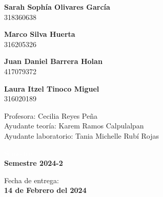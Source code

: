 \begin{titlepage}
\begin{minipage}{0.4\textwidth}
        \textbf{\large{Sarah Sophía Olivares García}}\\
        318360638
\end{minipage}
\begin{minipage}{0.4\textwidth}
    \begin{flushright}
        \textbf{\large{Marco Silva Huerta}}\\
        316205326        
    \end{flushright}
\end{minipage}

\vspace{5mm}

\begin{minipage}{0.4\textwidth}
        \textbf{\large{Juan Daniel Barrera Holan}}\\    
        417079372
\end{minipage}
\begin{minipage}{0.4\textwidth}
    \begin{flushright}
        \textbf{\large{Laura Itzel Tinoco Miguel}}\\
        316020189
    \end{flushright}
\end{minipage}

\vspace{10mm}

\begin{minipage}{0.8\textwidth}
    \begin{flushleft} \large
        Profesora: Cecilia Reyes Peña\\
        Ayudante teoría: Karem Ramos Calpulalpan \\
        Ayudante laboratorio: Tania Michelle Rubí Rojas\\                    
    \end{flushleft}
\end{minipage}

\vspace{20mm}

\begin{minipage}{0.4\textwidth}
    \textcolor{white}{Semestre}\\
    \large\textbf{Semestre 2024-2}      
\end{minipage}
\begin{minipage}{0.4\textwidth}
    \begin{flushright}
        {\large Fecha de entrega:\\
         \textbf{14 de Febrero del 2024}}
    \end{flushright}
\end{minipage}

\makeatother

\vfill 
\end{titlepage}